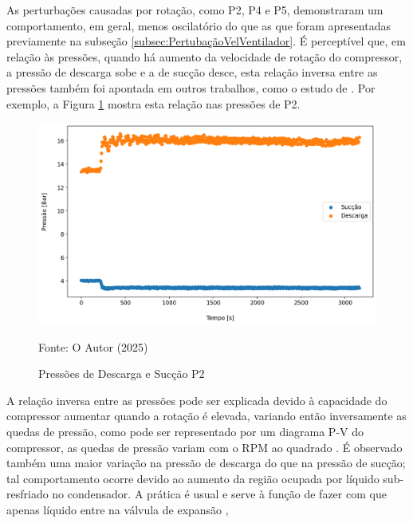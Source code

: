 As perturbações causadas por rotação, como P2, P4 e P5, demonstraram um comportamento, em geral, menos oscilatório do que as que foram apresentadas previamente na subseção \ref{subsec:PertubaçãoVelVentilador}. É perceptível que, em relação às pressões, quando há aumento da velocidade de rotação do compressor, a pressão de descarga sobe e a de sucção desce, esta relação inversa entre as pressões também foi apontada em outros trabalhos, como o estudo de \textcite{EffectsOFRefrigeranteCompressorAirFlow}. Por exemplo, a Figura \ref{fig:Pressão de Descarga e Sucção P2} mostra esta relação nas pressões de P2. 
\newpage
\begin{figure}
    \centering
    \includegraphics[width=1\linewidth]{FigurasdoTexto/Pressão de Descarga e Sucção P2.png}
    \caption{Pressões de Descarga e Sucção P2}
    \label{fig:Pressão de Descarga e Sucção P2}
    {\footnotesize Fonte: O Autor (2025)}
\end{figure}

A relação inversa entre as pressões pode ser explicada devido à capacidade do compressor aumentar quando a rotação é elevada, variando então inversamente as quedas de pressão, como pode ser representado por um diagrama P-V do compressor, as quedas de pressão variam com o RPM ao quadrado \cite{phillippi2008basic}.
É observado também uma maior variação na pressão de descarga do que na pressão de sucção; tal comportamento ocorre devido ao aumento da região ocupada por líquido sub-resfriado no condensador. A prática é usual e serve à função de fazer com que apenas líquido entre na válvula de expansão \cite{StoekerRefrigeration},

